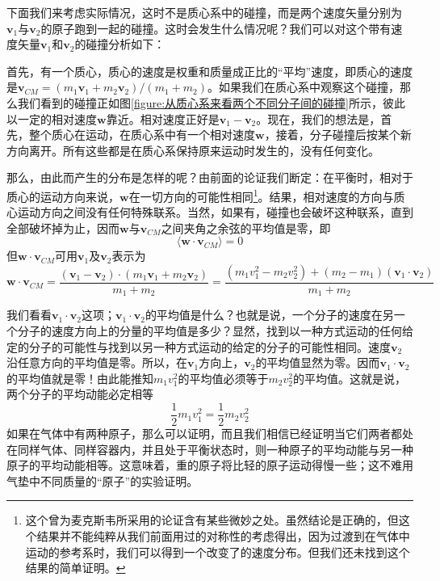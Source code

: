 下面我们来考虑实际情况，这时不是质心系中的碰撞，而是两个速度矢量分别为$\boldsymbol{v}_1$与$\boldsymbol{v}_2$的原子跑到一起的碰撞。这时会发生什么情况呢？我们可以对这个带有速度矢量$\boldsymbol{v}_1$和$\boldsymbol{v}_2$的碰撞分析如下：

首先，有一个质心，质心的速度是权重和质量成正比的“平均”速度，即质心的速度是$\boldsymbol{v}_{CM}=(m_1\boldsymbol{v}_1+m_2\boldsymbol{v}_2)/(m_1+m_2)$。如果我们在质心系中观察这个碰撞，那么我们看到的碰撞正如图\ref{figure:从质心系来看两个不同分子间的碰撞}所示，彼此以一定的相对速度$\boldsymbol{w}$靠近。相对速度正好是$\boldsymbol{v}_1-\boldsymbol{v}_2$。现在，我们的想法是，首先，整个质心在运动，在质心系中有一个相对速度$\boldsymbol{w}$，接着，分子碰撞后按某个新方向离开。所有这些都是在质心系保持原来运动时发生的，没有任何变化。

那么，由此而产生的分布是怎样的呢？由前面的论证我们断定：在平衡时，相对于质心的运动方向来说，$\boldsymbol{w}$在一切方向的可能性相同\footnote{这个曾为麦克斯韦所采用的论证含有某些微妙之处。虽然结论是正确的，但这个结果并不能纯粹从我们前面用过的对称性的考虑得出，因为过渡到在气体中运动的参考系时，我们可以得到一个改变了的速度分布。但我们还未找到这个结果的简单证明。}。结果，相对速度的方向与质心运动方向之间没有任何特殊联系。当然，如果有，碰撞也会破坏这种联系，直到全部破坏掉为止，因而$\boldsymbol{w}$与$\boldsymbol{v}_{CM}$之间夹角之余弦的平均值是零，即
\begin{equation}
    \label{Eq:I:39:19}
    \langle \boldsymbol{w}\cdot\boldsymbol{v}_{CM} \rangle = 0
\end{equation}
但$\boldsymbol{w}\cdot\boldsymbol{v}_{CM}$可用$\boldsymbol{v}_1$及$\boldsymbol{v}_2$表示为
\begin{equation}
    \label{Eq:I:39:20}
    \boldsymbol{w}\cdot\boldsymbol{v}_{CM} = \frac{(\boldsymbol{v}_1 - \boldsymbol{v}_2)\cdot(m_1\boldsymbol{v}_1 + m_2\boldsymbol{v}_2)}{m_1 + m_2} = \frac{(m_1v_1^2 - m_2v_2^2) + (m_2 - m_1)(\boldsymbol{v}_1 \cdot \boldsymbol{v}_2)}{m_1 + m_2}
\end{equation}

我们看看$\boldsymbol{v}_1 \cdot\boldsymbol{v}_2$这项；$\boldsymbol{v}_1 \cdot\boldsymbol{v}_2$的平均值是什么？也就是说，一个分子的速度在另一个分子的速度方向上的分量的平均值是多少？显然，找到以一种方式运动的任何给定的分子的可能性与找到以另一种方式运动的给定的分子的可能性相同。速度$\boldsymbol{v}_2$沿任意方向的平均值是零。所以，在$\boldsymbol{v}_1$方向上，$\boldsymbol{v}_2$的平均值显然为零。因而$\boldsymbol{v}_1 \cdot\boldsymbol{v}_2$的平均值就是零！由此能推知$m_1v_1^2$的平均值必须等于$m_2v_2^2$的平均值。这就是说，两个分子的平均动能必定相等
\begin{equation}
    \label{Eq:I:39:21}
    \frac{1}{2}m_1v_1^2 = \frac{1}{2}m_2v_2^2
\end{equation}
如果在气体中有两种原子，那么可以证明，而且我们相信已经证明当它们两者都处在同样气体、同样容器内，并且处于平衡状态时，则一种原子的平均动能与另一种原子的平均动能相等。这意味着，重的原子将比轻的原子运动得慢一些；这不难用气垫中不同质量的“原子”的实验证明。

